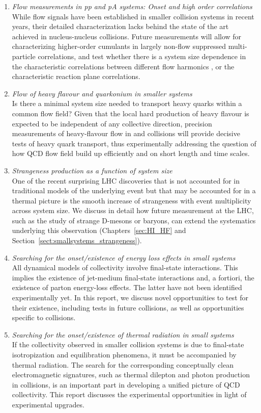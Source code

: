 \documentclass[../report.tex]{subfiles}
\begin{document}
\begin{enumerate}
\item {\it Flow measurements in pp and pA systems: Onset and high order correlations}\\ While flow signals have been established in smaller collision systems in recent years, their detailed characterization lacks behind the state of the art achieved in nucleus-nucleus collisions. Future measurements will allow for characterizing higher-order cumulants in largely non-flow suppressed multi-particle correlations, and test whether there is a system size dependence in the characteristic correlations between different flow harmonics \vn, or the characteristic reaction plane correlations. 
\item {\it Flow of heavy flavour and quarkonium in smaller systems}\\  Is there a minimal system size needed to transport heavy quarks within a common flow field? Given that the local hard production of heavy flavour is expected to be independent of any collective direction, precision measurements of heavy-flavour flow in \pp and \pA collisions will provide decisive tests of heavy quark transport, thus experimentally addressing the question of how QCD flow field build up efficiently and on short length and time scales.
\item  {\it Strangeness production as a function of system size}\\ One of the recent surprising LHC discoveries that is not accounted for in traditional models of the \pp underlying event but that may be accounted for in a thermal picture is the smooth increase of strangeness with event multiplicity across system size. We discuss in detail how future measurement at the LHC, such as the study of strange D-mesons or baryons, can extend the systematics underlying this observation (Chapters~\ref{sec:HI_HF} and Section~\ref{sect:smallsystems_strangeness}).
\item {\it Searching for the onset/existence of energy loss effects in small systems}\\ All dynamical models of collectivity involve final-state interactions. This implies the existence of jet-medium final-state interactions and, a fortiori, the existence of parton energy-loss effects. The latter have not been identified experimentally yet. In this report, we discuss novel opportunities to test for their existence, including tests in future \pPb collisions, as well as opportunities specific to \OO collisions.
\item {\it Searching for the onset/existence of thermal radiation in small systems}\\ If the collectivity observed in smaller collision systems is due to final-state isotropization and equilibration phenomena, it must be accompanied by thermal radiation. The search for the corresponding conceptually clean electromagnetic signatures, such as thermal dilepton and photon production in \pPb collisions, is an important part in developing a unified  picture of QCD collectivity. This report discusses the experimental opportunities in light of experimental upgrades.   
\end{enumerate}
\end{document}

